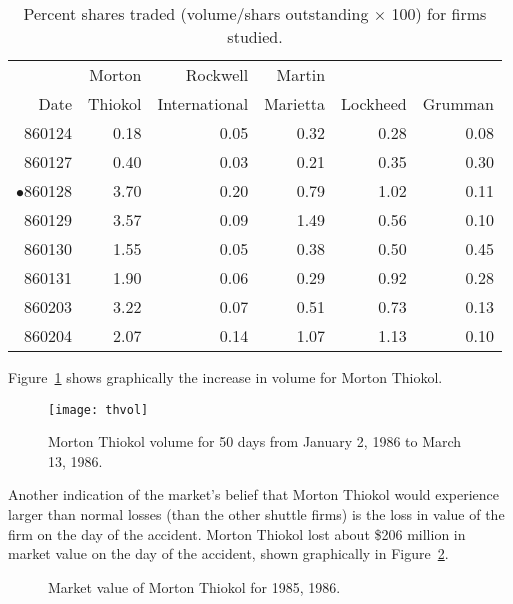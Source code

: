 \begin{table}[h!]
\caption{Percent shares traded (volume/shars outstanding
$\times$ 100) for firms studied.}
\sffamily
\begin{tabular*}{6in}{r@{\extracolsep{1em}}rrrrr}
\hline\hline       
       &  Morton & Rockwell & Martin &          &         \\
Date   &  Thiokol & International & Marietta & Lockheed & Grumman \\
\hline
860124 &   0.18 &   0.05 &   0.32 &   0.28 &   0.08  \\
860127 &   0.40 &   0.03 &   0.21 &   0.35 &   0.30  \\
$\bullet$860128 &   3.70 &   0.20 &   0.79 &   1.02 &   0.11  \\
860129 &   3.57 &   0.09 &   1.49 &   0.56 &   0.10  \\
860130 &   1.55 &   0.05 &   0.38 &   0.50 &   0.45  \\
860131 &   1.90 &   0.06 &   0.29 &   0.92 &   0.28  \\
860203 &   3.22 &   0.07 &   0.51 &   0.73 &   0.13  \\
860204 &   2.07 &   0.14 &   1.07 &   1.13 &   0.10  \\ \hline
\end{tabular*}
\label{percenttraded}
\end{table}

Figure~\ref{thvol} shows graphically the increase in volume
for Morton Thiokol.

\begin{figure}[hp]
\begin{center}
%
\texttt{[image: thvol]}
\end{center}
\caption{Morton Thiokol volume for 50 days from January 2,
1986 to March 13, 1986.}
\label{thvol}
\end{figure}


Another indication of the market's belief that Morton Thiokol would experience larger than normal losses (than the other shuttle firms) is the loss in value of the firm on the day of the accident. Morton Thiokol lost about \$206 million in market value on the day of the accident, shown graphically in Figure~\ref{thval}.

\begin{figure}[hp]
\begin{center}

\end{center}
\caption{Market value of Morton Thiokol for 1985, 1986.}
\label{thval}
\end{figure}

